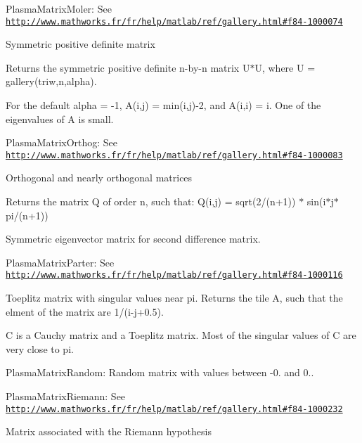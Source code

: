 \begin{DoxyItemize}
\item Plasma\+Matrix\+Moler\+: See \href{http://www.mathworks.fr/fr/help/matlab/ref/gallery.html#f84-1000074}{\tt http\+://www.\+mathworks.\+fr/fr/help/matlab/ref/gallery.\+html\#f84-\/1000074}\end{DoxyItemize}
Symmetric positive definite matrix

Returns the symmetric positive definite n-\/by-\/n matrix U\textquotesingle{}$\ast$\+U, where U = gallery(\textquotesingle{}triw\textquotesingle{},n,alpha).

For the default alpha = -\/1, A(i,j) = min(i,j)-\/2, and A(i,i) = i. One of the eigenvalues of A is small.

\begin{DoxyItemize}
\item Plasma\+Matrix\+Orthog\+: See \href{http://www.mathworks.fr/fr/help/matlab/ref/gallery.html#f84-1000083}{\tt http\+://www.\+mathworks.\+fr/fr/help/matlab/ref/gallery.\+html\#f84-\/1000083}\end{DoxyItemize}
Orthogonal and nearly orthogonal matrices

Returns the matrix Q of order n, such that\+: Q(i,j) = sqrt(2/(n+1)) $\ast$ sin(i$\ast$j$\ast$pi/(n+1))

Symmetric eigenvector matrix for second difference matrix.

\begin{DoxyItemize}
\item Plasma\+Matrix\+Parter\+: See \href{http://www.mathworks.fr/fr/help/matlab/ref/gallery.html#f84-1000116}{\tt http\+://www.\+mathworks.\+fr/fr/help/matlab/ref/gallery.\+html\#f84-\/1000116}\end{DoxyItemize}
Toeplitz matrix with singular values near pi. Returns the tile A, such that the elment of the matrix are 1/(i-\/j+0.5).

C is a Cauchy matrix and a Toeplitz matrix. Most of the singular values of C are very close to pi.

\begin{DoxyItemize}
\item Plasma\+Matrix\+Random\+: Random matrix with values between -\/0. and 0..\end{DoxyItemize}
\begin{DoxyItemize}
\item Plasma\+Matrix\+Riemann\+: See \href{http://www.mathworks.fr/fr/help/matlab/ref/gallery.html#f84-1000232}{\tt http\+://www.\+mathworks.\+fr/fr/help/matlab/ref/gallery.\+html\#f84-\/1000232}\end{DoxyItemize}
Matrix associated with the Riemann hypothesis

